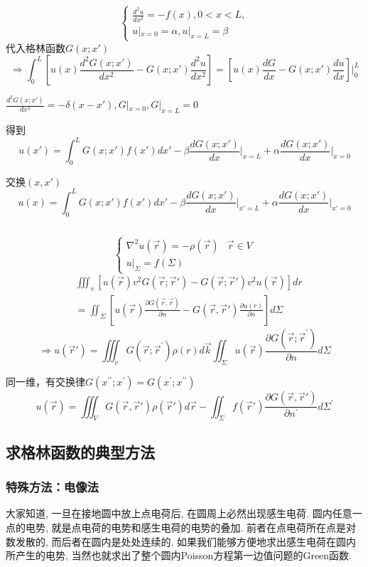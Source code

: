 \begin{ex}
$$\begin{cases}\frac{d^{2}u}{dx^{2}}=-f(x),0<x<L,\\u|_{x=0}=\alpha,u|_{x=L}=\beta\end{cases}$$
代入格林函数$G(x;x')$
$$\Rightarrow\int_{0}^{L}\left[u(x)\frac{d^{2}G(x;x')}{dx^{2}}-G(x;x')\frac{d^{2}u}{dx^{2}}\right]=\left[u(x)\frac{dG}{dx}-G(x;x')\frac{du}{dx}\right]\bigg|_{0}^{L}$$

$\frac{d^{2}G(x;x')}{dx^{2}}=-\delta(x-x'), G|_{x=0},G|_{x=L}=0$

得到
$$u(x')=\int_{0}^{L}G(x;x')f(x')dx'-\beta\frac{dG(x;x')}{dx}\bigg|_{x=L}+\alpha\frac{dG(x;x')}{dx}|_{x=0}$$

交换$(x,x')$
$$u(x)=\int_{0}^{L}G(x;x')f(x')dx'-\beta\frac{dG(x;x')}{dx}\bigg|_{x'=L}+\alpha\frac{dG(x;x')}{dx}|_{x'=0}$$
\end{ex}
$$$$

\begin{ex}[三维电势分布]
$$\begin{cases}\nabla^{2}u(\vec{r})=-\rho(\vec{r})&\vec{r}\in V\\u|_{\Sigma}=f(\Sigma)\end{cases}$$
$$\begin{aligned}
    &\iiint_v[u(\vec{r})v^{2}G(\vec{r};\vec{r}')-G(\vec{r};\vec{r}')v^{2}u(\vec{r})]dr\\
    &=\iint_\Sigma[u(\vec{r})\frac{\partial G(\vec{r},\vec{r})}{\partial n}-G(\vec{r},\vec{r}')\frac{\partial u(r)}{\partial n}]d\Sigma
\end{aligned}$$
$$\Rightarrow u(\vec{r}')=\iiint_{v}G(\vec{r};\vec{r}^{\prime})\rho(r)d\vec{k}\iint_{\Sigma}u(\vec{r})\frac{\partial G(\vec{r};\vec{r}^{\prime})}{\partial n}d\Sigma $$

同一维，有交换律$G(x^{\prime\prime};x^{\prime})=G(x^{\prime};x^{\prime\prime})$
$$u(\vec{r})=\iiint_{V}G(\vec{r},\vec{r}')\rho(\vec{r}')d\vec{r}-\iint_{\Sigma}f(\vec{r}')\frac{\partial G(\vec{r},\vec{r}')}{\partial n^{\prime}}d\Sigma^{\prime}$$

\end{ex}

\subsection{求格林函数的典型方法}
\subsubsection{特殊方法：电像法}
大家知道, 一旦在接地圆中放上点电荷后, 在圆周上必然出现感生电荷. 
圆内任意一点的电势, 就是点电荷的电势和感生电荷的电势的叠加. 
前者在点电荷所在点是对数发散的, 而后者在圆内是处处连续的. 
如果我们能够方便地求出感生电荷在圆内所产生的电势, 当然也就求出了整个圆内Poisson方程第一边值问题的Green函数.

